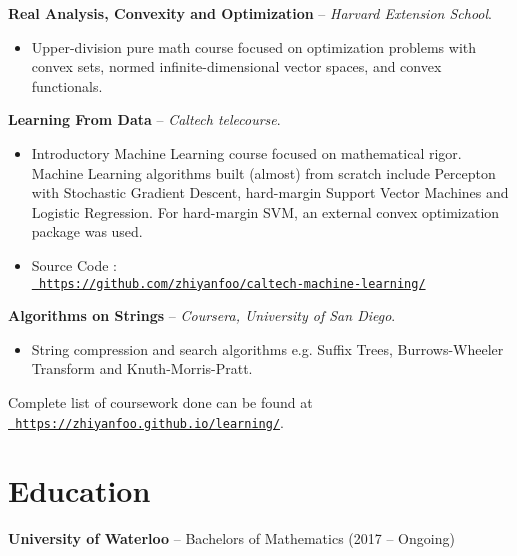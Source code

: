 \documentclass[12pt, margin]{res}
\begin{document}
\begin{resume}
    {\bf Real Analysis, Convexity and Optimization} -- {\it Harvard Extension
    School}.
    \begin{itemize} \itemsep -2pt
        \item Upper-division pure math course focused on optimization problems
            with convex sets, normed infinite-dimensional vector spaces, and
            convex functionals.
    \end{itemize}
    {\bf Learning From Data} -- {\it Caltech telecourse}.
    \begin{itemize} \itemsep -2pt
        \item Introductory Machine Learning course focused on mathematical
          rigor. Machine Learning algorithms built (almost) from scratch include
            Percepton with Stochastic Gradient Descent, hard-margin Support
            Vector Machines and Logistic Regression. For hard-margin SVM, an
            external convex optimization package was used.
        \item Source Code :\\
    \href{https://github.com/zhiyanfoo/caltech-machine-learning/}{\tt
    https://github.com/zhiyanfoo/caltech-machine-learning/}
    \end{itemize} 
    {\bf Algorithms on Strings} -- {\it Coursera, University of San Diego}. 
    \begin{itemize} \itemsep -2pt
        \item String compression and search algorithms  e.g. Suffix
            Trees, Burrows-Wheeler Transform and Knuth-Morris-Pratt.
    \end{itemize}
Complete list of coursework done can be found at \\
\href{https://zhiyanfoo.github.io/learning/}{\tt
https://zhiyanfoo.github.io/learning/}.
\section{Education} 
    {\bf University of Waterloo} -- Bachelors of Mathematics 
    (2017 -- Ongoing)
\end{resume} 
\end{document}
